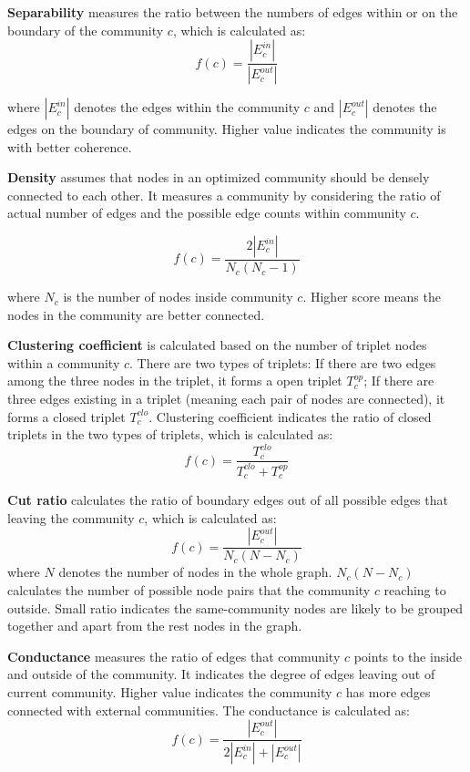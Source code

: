 \textbf{Separability} measures the ratio between the numbers of edges within or on the boundary of the community $c$, which is calculated as:
\begin{equation}
f(c) = \frac{|E_{c}^{in}|}{|E_{c}^{out}|}
\end{equation}

where $|E_{c}^{in}|$ denotes the edges within the community $c$ and $|E_{c}^{out}|$ denotes the edges on the boundary of community. Higher value indicates the community is with better coherence. 

\textbf{Density} assumes that nodes in an optimized community should be densely connected to each other. It measures a community by considering the ratio of actual number of edges and the possible edge counts within community $c$.

\begin{equation}
	f(c) = \frac{2|E_{c}^{in}|}{N_{c}(N_{c}-1)}
\end{equation}

where $N_{c}$ is the number of nodes inside community $c$.  Higher score means the nodes in the community are better connected.

\textbf{Clustering coefficient} is calculated based on the number of triplet nodes within a community $c$. There are two types of triplets: If there are two edges among the three nodes in the triplet, it forms a open triplet $T_{c}^{op}$; If there are three edges existing in a triplet (meaning each pair of nodes are connected), it forms a closed triplet  $T_{c}^{clo}$.  Clustering coefficient indicates the ratio of closed triplets in the two types of triplets, which is calculated as: 
\begin{equation}
f(c) = \frac{T_{c}^{clo}}{T_{c}^{clo} +T_{c}^{op} }
\end{equation}

\textbf{Cut ratio} calculates the ratio of boundary edges out of all possible edges that leaving the community $c$, which is calculated as:
\begin{equation}
f(c) = \frac{|E_{c}^{out}|}{N_{c}(N-N_{c})}
\end{equation}
where $N$ denotes the number of nodes in the whole graph. $N_{c}(N-N_{c})$ calculates the number of possible node pairs that the community $c$ reaching to outside. Small ratio indicates the same-community nodes are likely to be grouped together and apart from the rest nodes in the graph.

\textbf{Conductance} measures the ratio of edges that community $c$ points to the inside and outside of the community. It indicates the degree of edges leaving out of current community. Higher value indicates the community $c$ has more edges connected with external communities. The conductance is calculated as:
\begin{equation}
f(c) = \frac{|E_{c}^{out}|}{2|E_{c}^{in}|+|E_{c}^{out}|}
\end{equation}

